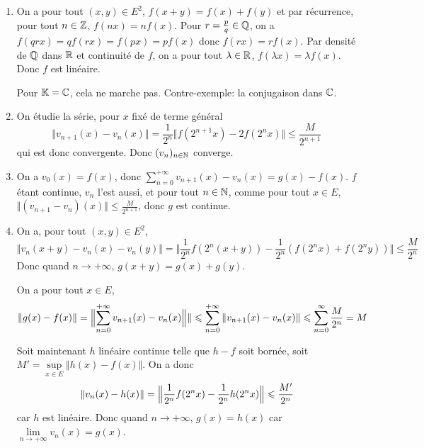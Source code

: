 \begin{solution}
	\phantom{}
	\begin{enumerate}
		\item On a pour tout $(x,y)\in E^{2}$, $f(x+y)=f(x)+f(y)$ et par récurrence, pour tout $n\in\mathbb{Z}$, $f(nx)=nf(x)$. Pour $r=\frac{p}{q}\in\mathbb{Q}$, on a $f(qrx)=qf(rx)=f(px)=pf(x)$ donc $f(rx)=rf(x)$. Par densité de $\mathbb{Q}$ dans $\mathbb{R}$ et continuité de $f$, on a pour tout $\lambda\in\mathbb{R}$, $f(\lambda x)=\lambda f(x)$. Donc $f$ est linéaire.
		
		Pour $\mathbb{K}=\mathbb{C}$, cela ne marche pas. Contre-exemple: la conjugaison dans $\mathbb{C}$.

		\item On étudie la série, pour $x$ fixé de terme général 
		$$\Vert v_{n+1}(x)-v_{n}(x)\Vert=\frac{1}{2^{n}}\Vert f(2^{n+1}x)-2f(2^{n}x)\Vert\leqslant\frac{M}{2^{n+1}}$$
		qui est donc convergente. Donc $(v_{n})_{n\in\mathbb{N}}$ converge.

		\item On a $v_{0}(x)=f(x)$, donc $\sum_{n=0}^{+\infty}v_{n+1}(x)-v_{n}(x)=g(x)-f(x)$. $f$ étant continue, $v_{n}$ l'est aussi, et pour tout $n\in\mathbb{N}$, comme pour tout $x\in E$, $\Vert (v_{n+1}-v_{n})(x)\Vert\leqslant\frac{M}{2^{n+1}}$, donc $g$ est continue.
		
		\item On a, pour tout $(x,y)\in E^{2}$,
		$$\Vert v_{n}(x+y)-v_{n}(x)-v_{n}(y)\Vert=\Vert \frac{1}{2^{n}}f(2^{n}(x+y))-\frac{1}{2^{n}}(f(2^{n}x)+f(2^{n}y))\Vert\leqslant\frac{M}{2^{n}}$$
		Donc quand $n\to+\infty$, $g(x+y)=g(x)+g(y)$.

		On a pour tout $x\in E$, 
		$$\Vert g(x)-f(x)\Vert=\Bigl\lVert\sum_{n=0}^{+\infty}v_{n+1}(x)-v_{n}(x)\Bigr\Vert\rVert\leqslant\sum_{n=0}^{+\infty}\Vert v_{n+1}(x)-v_{n}(x)\Vert\leqslant\sum_{n=0}^{\infty}\frac{M}{2^{n}}=M$$

		Soit maintenant $h$ linéaire continue telle que $h-f$ soit bornée, soit $M'=\sup\limits_{x\in E}\Vert h(x)-f(x)\Vert$. On a donc 
		$$\Vert v_{n}(x)-h(x)\Vert=\Bigl\Vert\frac{1}{2^{n}}f(2^{n}x)-\frac{1}{2^{n}}h(2^{n}x)\Bigr\Vert\leqslant\frac{M'}{2^{n}}$$
		car $h$ est linéaire. Donc quand $n\to+\infty$, $g(x)=h(x)$ car $\lim\limits_{n\to+\infty}v_{n}(x)=g(x)$.
	\end{enumerate}
\end{solution}

